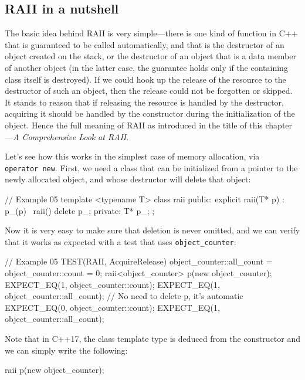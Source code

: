 \subsection{RAII in a nutshell}

The basic idea behind RAII is very simple---there is one kind of function in C++ that is guaranteed to be called automatically, and that is the destructor of an object created on the stack, or the destructor of an object that is a data member of another object (in the latter case, the guarantee holds only if the containing class itself is destroyed). If we could hook up the release of the resource to the destructor of such an object, then the release could not be forgotten or skipped. It stands to reason that if releasing the resource is handled by the destructor, acquiring it should be handled by the constructor during the initialization of the object. Hence the full meaning of RAII as introduced in the title of this chapter---\emph{A Comprehensive Look} \emph{at RAII}.

Let's see how this works in the simplest case of memory allocation, via \texttt{operator\ new}. First, we need a class that can be initialized from a pointer to the newly allocated object, and whose destructor will delete that object:

\begin{code}
// Example 05
template <typename T> class raii {
  public:
  explicit raii(T* p) : p_(p) {}
  ~raii() { delete p_; }
  private:
  T* p_;
};
\end{code}

Now it is very easy to make sure that deletion is never omitted, and we can verify that it works as expected with a test that uses \texttt{object\_counter}:

\begin{code}
// Example 05
TEST(RAII, AcquireRelease) {
  object_counter::all_count = object_counter::count = 0;
  {
    raii<object_counter> p(new object_counter);
    EXPECT_EQ(1, object_counter::count);
    EXPECT_EQ(1, object_counter::all_count);
  } // No need to delete p, it's automatic
  EXPECT_EQ(0, object_counter::count);
  EXPECT_EQ(1, object_counter::all_count);
}
\end{code}

Note that in C++17, the class template type is deduced from the constructor and we can simply write the following:

\begin{code}
raii p(new object_counter);
\end{code}

